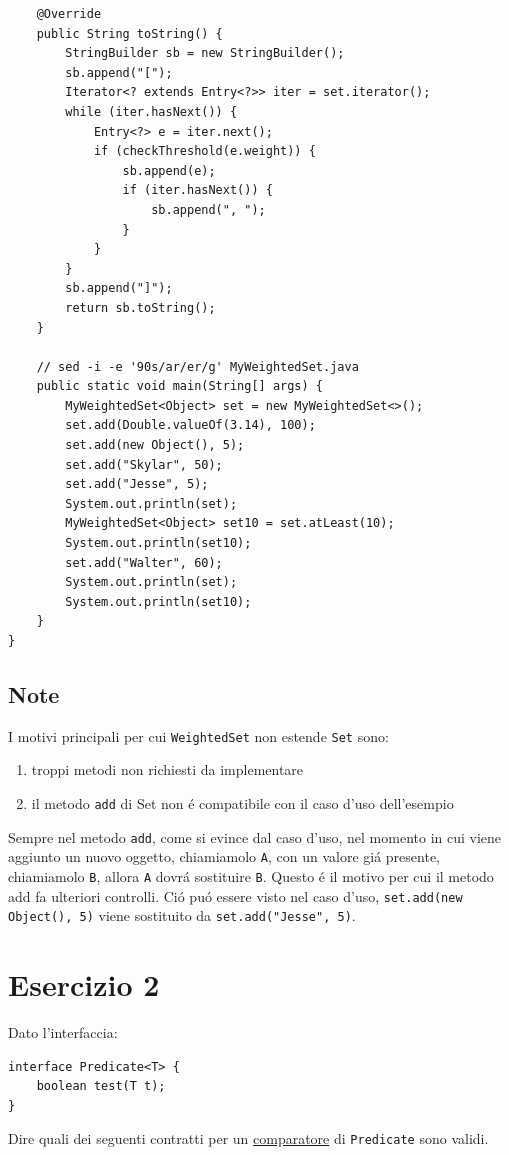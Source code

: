 \documentclass[11pt]{article}
\begin{document}
\begin{verbatim}
    @Override
    public String toString() {
        StringBuilder sb = new StringBuilder();
        sb.append("[");
        Iterator<? extends Entry<?>> iter = set.iterator();
        while (iter.hasNext()) {
            Entry<?> e = iter.next();
            if (checkThreshold(e.weight)) {
                sb.append(e);
                if (iter.hasNext()) {
                    sb.append(", ");
                }
            }
        }
        sb.append("]");
        return sb.toString();
    }

    // sed -i -e '90s/ar/er/g' MyWeightedSet.java
    public static void main(String[] args) {
        MyWeightedSet<Object> set = new MyWeightedSet<>();
        set.add(Double.valueOf(3.14), 100);
        set.add(new Object(), 5);
        set.add("Skylar", 50);
        set.add("Jesse", 5);
        System.out.println(set);
        MyWeightedSet<Object> set10 = set.atLeast(10);
        System.out.println(set10);
        set.add("Walter", 60);
        System.out.println(set);
        System.out.println(set10);
    }
}
\end{verbatim}
\subsection{Note}
\label{sec:org2b2dfa2}
I motivi principali per cui \texttt{WeightedSet} non estende \texttt{Set} sono:
\begin{enumerate}
\item troppi metodi non richiesti da implementare
\item il metodo \texttt{add} di Set non é compatibile con il caso d'uso dell'esempio
\end{enumerate}

Sempre nel metodo \texttt{add}, come si evince dal caso d'uso, nel momento in cui viene aggiunto un nuovo oggetto, chiamiamolo \texttt{A}, con un valore giá presente, chiamiamolo \texttt{B}, allora \texttt{A} dovrá sostituire \texttt{B}.
Questo é il motivo per cui il metodo add fa ulteriori controlli.
Ció puó essere visto nel caso d'uso, \texttt{set.add(new Object(), 5)} viene sostituito da \texttt{set.add("Jesse", 5)}.
\section{Esercizio 2}
\label{sec:org7c84f6e}
Dato l'interfaccia:
\begin{verbatim}
interface Predicate<T> {
    boolean test(T t);
}
\end{verbatim}
Dire quali dei seguenti contratti per un \uline{comparatore} di \texttt{Predicate} sono validi.
\end{document}
